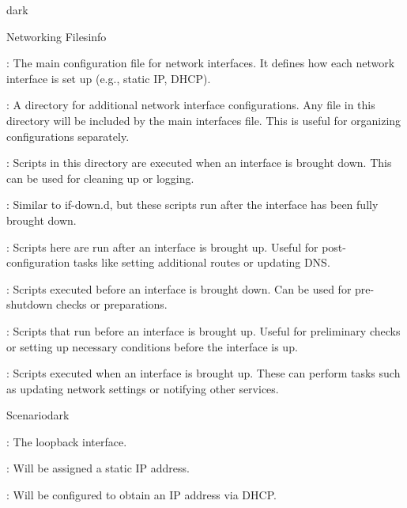 \label{Networking}
\begin{baseBoxThree}{}{dark}

    \label{Networking Files}
    \begin{baseBoxThree}{Networking Files}{info}
        \begin{posnexItemize}
            \item[\sA] : The main configuration file for network interfaces. It defines how each network interface is set up (e.g., static IP, DHCP).
            \item[\sA] : A directory for additional network interface configurations. Any file in this directory will be included by the main interfaces file. This is useful for organizing configurations separately. 
            \item[\sA] : Scripts in this directory are executed when an interface is brought down. This can be used for cleaning up or logging. 
            \item[\sA] : Similar to if-down.d, but these scripts run after the interface has been fully brought down. 
            \item[\sA] : Scripts here are run after an interface is brought up. Useful for post-configuration tasks like setting additional routes or updating DNS.
            \item[\sA] : Scripts executed before an interface is brought down. Can be used for pre-shutdown checks or preparations.
            \item[\sA] : Scripts that run before an interface is brought up. Useful for preliminary checks or setting up necessary conditions before the interface is up.
            \item[\sA] : Scripts executed when an interface is brought up. These can perform tasks such as updating network settings or notifying other services.
        \end{posnexItemize}
    \end{baseBoxThree}
    \smallskip
    \label{Scripts in Action}
    \begin{baseBoxThree}{Scenario}{dark}
        \begin{posnexItemize}
            \item[\sA] : The loopback interface.
            \item[\sA] : Will be assigned a static IP address.
            \item[\sA] : Will be configured to obtain an IP address via DHCP.
        \end{posnexItemize}        
    \end{baseBoxThree}
\end{baseBoxThree}

